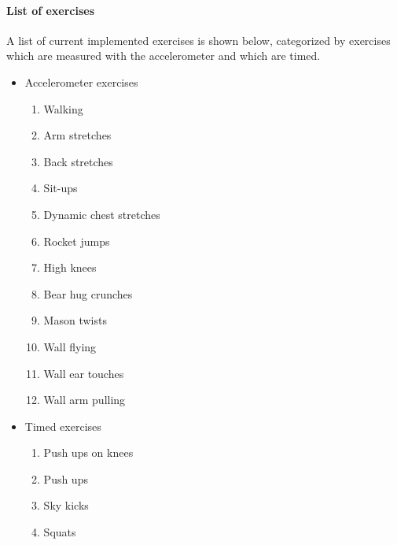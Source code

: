 \paragraph{List of exercises}
A list of current implemented exercises is shown below, categorized by exercises which are measured with the accelerometer and which are timed.
\begin{itemize}
\item Accelerometer exercises %
\begin{enumerate}
\item Walking
\item Arm stretches
\item Back stretches
\item Sit-ups
\item Dynamic chest stretches
\item Rocket jumps
\item High knees
\item Bear hug crunches
\item Mason twists
\item Wall flying
\item Wall ear touches
\item Wall arm pulling
\end{enumerate}
\item Timed exercises %
\begin{enumerate}
\item Push ups on knees
\item Push ups
\item Sky kicks
\item Squats
\end{enumerate}
\end{itemize}


